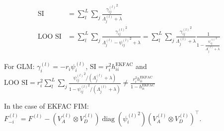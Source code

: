 \documentclass[11pt]{article}
\DeclareMathOperator{\diag}{diag}
\begin{document}
\begin{align*}
	\text{SI}&=\sum_l^L\sum_j\frac{{\gamma^{(l)}_{ij}}^2}{\Lambda^{(l)}_j+\lambda}\\
	\text{LOO SI}&=\sum_l^L\sum_j\frac{{\gamma^{(l)}_{ij}}^2}{\Lambda^{(l)}_j-{\psi^{(l)}_{ij}}^2+\lambda}
	=\sum_l^L\sum_j\frac{{\gamma^{(l)}_{ij}}^2}{\Lambda^{(l)}_j+\lambda}\frac{1}{1-\frac{{\psi^{(l)}_{ij}}^2}{\Lambda^{(l)}_j+\lambda}}
\end{align*}

For GLM: $\gamma^{(l)}_i=-r_i\psi^{(l)}_i$, $\text{SI}=r_i^2h^{\mathrm{EKFAC}}_{ii}$ and $\text{LOO SI}=r_i^2\sum_l^L\sum_j\frac{{\psi^{(l)}_{ij}}^2/(\Lambda^{(l)}_j+\lambda)}{1-{\psi^{(l)}_{ij}}^2/(\Lambda^{(l)}_j+\lambda)}\neq\frac{r_i^2h^{\mathrm{EKFAC}}_{ii}}{1-h^{\mathrm{EKFAC}}_{ii}}$

In the case of EKFAC FIM: $F^{(l)}_{-i}=F^{(l)}-\left(V^{(l)}_A\otimes V^{(l)}_D\right)\diag\left({\psi^{(l)}_i}^2\right)\left(V^{(l)}_A\otimes V^{(l)}_D\right)^\top$.
\end{document}
